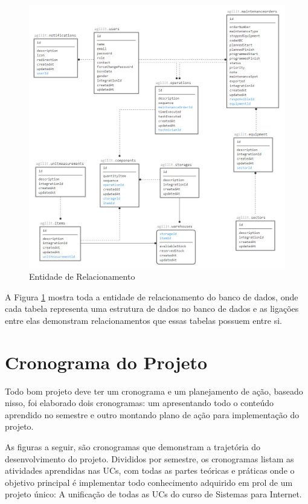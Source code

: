 {{\newpage
\begin{figure}[htb]
	\caption{\label{entidade_relacionamento}Entidade de Relacionamento}
	\begin{center}
		\includegraphics[scale=0.70]{./Figuras/er3.png}
	\end{center}
\end{figure}

A Figura \ref{entidade_relacionamento} mostra toda a entidade de relacionamento do banco de dados, onde cada tabela representa uma estrutura de dados no banco de dados e as ligações entre elas demonstram relacionamentos que essas tabelas possuem entre si.


\newpage
\section{Cronograma do Projeto}


Todo bom projeto deve ter um cronograma e um planejamento de ação, baseado nisso, foi elaborado dois cronogramas: um apresentando todo o conteúdo aprendido no semestre e outro montando plano de ação para implementação do projeto.

As figuras a seguir, são cronogramas que demonstram a trajetória do desenvolvimento do projeto. Divididos por semestre, os cronogramas listam as atividades aprendidas nas UCs, com todas as partes teóricas e práticas onde o objetivo principal é implementar todo conhecimento adquirido em prol de um projeto único: A unificação de todas as UCs do curso de Sistemas para Internet.

}}
